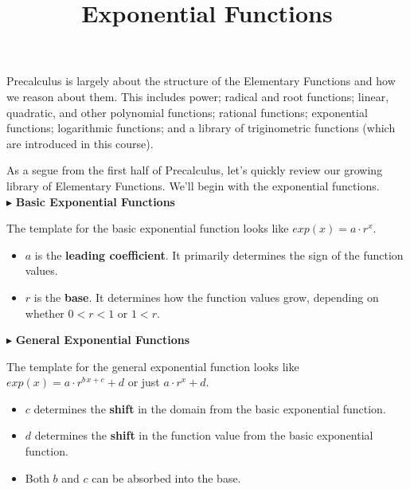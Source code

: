 \documentclass{ximera}
\title{Exponential Functions}
\begin{document}
\begin{abstract}
\end{abstract}
\maketitle




Precalculus is largely about the structure of the Elementary Functions and how we reason about them.  This includes power; radical and root functions; linear, quadratic, and other polynomial functions; rational functions; exponential functions; logarithmic functions; and a library of triginometric functions (which are introduced in this course).

As a segue from the first half of Precalculus, let's quickly review our growing library of Elementary Functions. We'll begin with the exponential functions.   \\





$\blacktriangleright$ \textbf{\textcolor{blue!55!black}{Basic Exponential Functions}} 


The template for the basic exponential function looks like \textbf{\textcolor{blue!55!black}{$exp(x) = a \cdot r^x$}}. 

\begin{itemize}
\item $a$ is the \textbf{\textcolor{purple!85!blue}{leading coefficient}}.  It primarily determines the sign of the function values.
\item $r$ is the \textbf{\textcolor{purple!85!blue}{base}}. It determines how the function values grow, depending on whether $0 < r < 1$ or $1 < r$.
\end{itemize}





$\blacktriangleright$ \textbf{\textcolor{blue!55!black}{General Exponential Functions}}   

The template for the general exponential function looks like \textbf{\textcolor{blue!55!black}{$exp(x) = a \cdot r^{b \, x + c} + d$}}  or just \textbf{\textcolor{blue!55!black}{$a \cdot r^x + d$}}. 

\begin{itemize}
\item $c$ determines the \textbf{\textcolor{purple!85!blue}{shift}} in the domain from the basic exponential function.  
\item $d$ determines the \textbf{\textcolor{purple!85!blue}{shift}} in the function value from the basic exponential function. 
\item Both $b$ and $c$ can be absorbed into the base.
\end{itemize}
\end{document}
